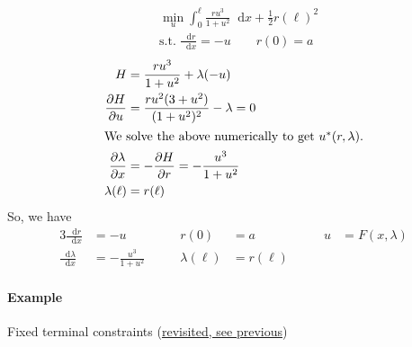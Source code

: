 \documentclass[letterpaper,12pt,titlepage]{report}
\newcommand*\dif{\mathop{}\!\mathrm{d}}
\newcommand*\pder[2]{\frac{\partial #1}{\partial #2}}
\theoremstyle{plain}
\theoremstyle{definition}
\begin{document}
\begin{align}
  & \min_u \int_0^\ell \frac{ru^3}{1+u^2}\dif x + \frac12 r(\ell)^2 \\
  & \text{s.t. } \frac{\dif r}{\dif x} = -u \qquad r(0) = a
\end{align}
\begin{align}
  H &= \frac{ru^3}{1+u^2} + \lambda(-u) \\
  \pder{H}{u} &= \frac{ru^2(3+u^2)}{(1+u^2)^2} - \lambda = 0 \\
  \shortintertext{We solve the above numerically to get $u^*(r,\lambda)$.}
  \pder{\lambda}{x} &= -\pder{H}{r} = -\frac{u^3}{1+u^2} \\
  \lambda(\ell) &= r(\ell)
\end{align}
So, we have
\begin{alignat}{3}
  \frac{\dif r}{\dif x} &= -u & r(0) &= a & u &= F(x,\lambda) \\
  \frac{\dif\lambda}{\dif x} &= -\frac{u^3}{1+u^2} \qquad & \lambda(\ell) &= r(\ell) \qquad
\end{alignat}

\paragraph{Example} Fixed terminal constraints (\hyperlink{fixed_term_cons}{revisited, see previous})
\end{document}
